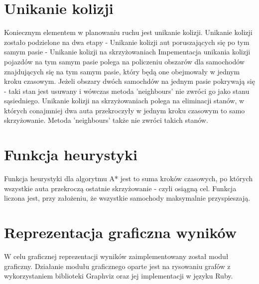 \section{Unikanie kolizji}

Koniecznym elementem w planowaniu ruchu jest unikanie kolizji.
\newline
\newline
Unikanie kolizji zostało podzielone na dwa etapy
\newline
- Unikanie kolizji aut poruszających się po tym samym pasie
\newline
- Unikanie kolizji na skrzyżowaniach
\newline
\newline
Impementacja unikania kolizji pojazdów na tym samym pasie polega na policzeniu obszarów dla samochodów znajdujących się na tym samym pasie, który będą one obejmowały w jednym kroku czasowym.
\newline
\newline
Jeżeli obszary dwóch samochdów na jednym pasie pokrywają się - taki stan jest usuwany i wówczas metoda 'neighbours' nie zwróci go jako stanu sąsiedniego.
\newline
\newline
Unikanie kolizji na skrzyżowaniach polega na eliminacji stanów, w których conajmniej dwa auta przekroczyły w jednym kroku czasowym to samo skrzyżowanie. Metoda 'neighbours' także nie zwróci takich stanów.

\section{Funkcja heurystyki}

Funkcja heurystyki dla algorytmu A* jest to suma kroków czasowych, po których wszystkie auta przekroczą ostatnie skrzyżowanie - czyli osiągną cel. Funkcja liczona jest, przy założeniu, że wszystkie samochody maksymalnie przyspieszają.

\section{Reprezentacja graficzna wyników}

W celu graficznej reprezentacji wyników zaimplementowany został moduł graficzny.
\newline
\newline
Działanie modułu graficznego oparte jest na rysowaniu grafów z wykorzystaniem biblioteki Graphviz oraz jej implementacji w języku Ruby.
\newline
